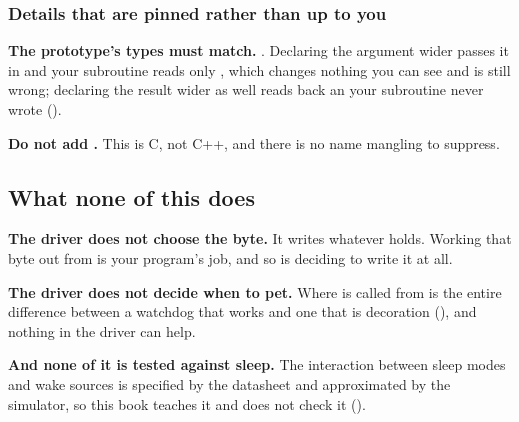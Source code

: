 \subsubsection{Details that are pinned rather than up to you}
\textbf{The prototype's types must match.} . Declaring the
argument wider passes it in  and your subroutine reads only , which changes
nothing you can see and is still wrong; declaring the result wider as well reads back an
 your subroutine never wrote ().

\textbf{Do not add .} This is C, not C++, and there is no name mangling to
suppress.

\subsection{What none of this does}
\label{c6:sec:notdo}
\textbf{The driver does not choose the byte.} It writes whatever  holds. Working that
byte out from  is your program's job, and so is deciding to write it at
all.

\textbf{The driver does not decide when to pet.} Where  is called from is the
entire difference between a watchdog that works and one that is decoration
(), and nothing in the driver can help.

\textbf{And none of it is tested against sleep.} The interaction between sleep modes and wake
sources is specified by the datasheet and approximated by the simulator, so this book teaches it
and does not check it ().
